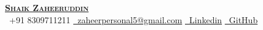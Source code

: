 \begin{center}
    \textbf{{\href{https://github.com/shaik-zaheeruddin}{ \Huge \scshape Shaik Zaheeruddin}}} \\ \vspace{1pt}
    \faPhone \ \small +91 8309711211 \quad
    \href{mailto:zaheerpersonal5@gmail.com}{\faEnvelope \ zaheerpersonal5@gmail.com} \quad
    \href{https://www.linkedin.com/in/shaik-zaheeruddin-252405217/}{\faLinkedin \ Linkedin} \quad
    \href{https://github.com/shaik-zaheeruddin}{\faGithub \ GitHub}
\end{center}

